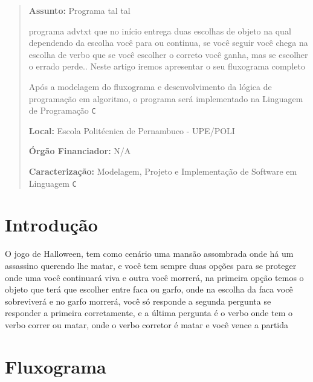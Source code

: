 \documentclass[a4paper,12pt]{article} %
\begin{document}
\begin{abstract}

\textbf{Assunto:} Programa tal tal


programa advtxt que no início entrega duas escolhas de objeto na qual dependendo da escolha você para ou continua, se você seguir você chega na escolha de verbo que se você escolher o correto você ganha, mas se escolher o errado perde.. Neste artigo iremos apresentar o seu fluxograma completo

Após a modelagem do fluxograma e desenvolvimento da lógica de programação em algoritmo,
o programa será implementado na Linguagem de Programação \texttt{C}


\textbf{Local:} Escola Politécnica de Pernambuco - UPE/POLI

\textbf{Órgão Financiador:} N/A

\textbf{Caracterização:} Modelagem, Projeto e Implementação de Software em Linguagem \texttt{C}


\end{abstract}


\section{Introdução}


O jogo de Halloween, tem como cenário uma mansão assombrada onde há um assassino
querendo lhe matar, e você tem sempre duas opções para se proteger onde uma você
continuará viva e outra você morrerá, na primeira opção temos o objeto que terá que
escolher entre faca ou garfo, onde na escolha da faca você sobreviverá e no garfo
morrerá, você só responde a segunda pergunta se responder a primeira corretamente, e a
última pergunta é o verbo onde tem o verbo correr ou matar, onde o verbo corretor é
matar e você vence a partida
\section{Fluxograma}
\end{document}
